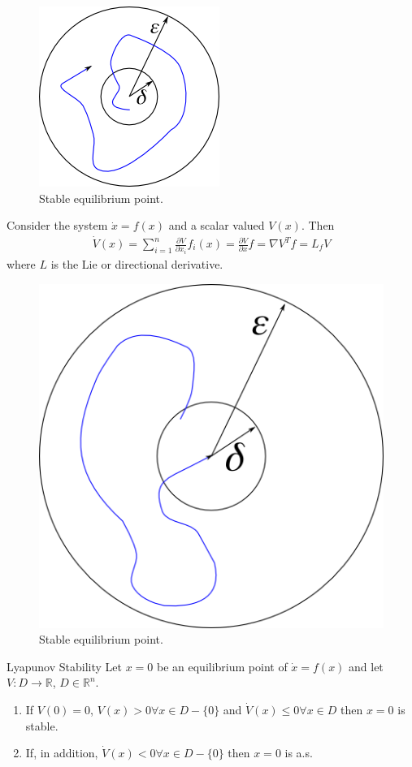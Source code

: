 \begin{figure}[ht!]
\centering
\includegraphics[width=.4\textwidth]{images/07stableEqPoint}
\caption{Stable equilibrium point.}
\label{fig:07stableEqPoint}
\end{figure}

\begin{definition}
Consider the system $\dot{x}=f(x)$ and a scalar valued $V(x)$. Then
\begin{align*}
\dot{V}(x) = \sum_{i=1}^n \frac{\partial V}{\partial x_i} f_i(x) = \frac{\partial V}{\partial x}f = \nabla V^T f = L_f V
\end{align*}
where $L$ is the Lie or directional derivative.
\end{definition}

\begin{figure}[ht!]
\centering
\includegraphics[width=.4\textwidth]{images/07attractiveNotStable}
\caption{Stable equilibrium point.}
\label{fig:07attractiveNotStable}
\end{figure}

\begin{theorem}{Lyapunov Stability}
Let $x=0$ be an equilibrium point of $\dot{x}=f(x)$ and let $V:D\to\mathbb{R}$, $D\in\mathbb{R}^n$.
\begin{enumerate}
\item If $V(0)=0$, $V(x)>0 \forall x \in D - \{0\}$ and $\dot{V}(x)\leq0 \forall x\in D$ then $x=0$ is stable.
\item If, in addition, $\dot{V}(x)<0 \forall x\in D-\{0\}$ then $x=0$ is a.s.
\end{enumerate}
\end{theorem}

